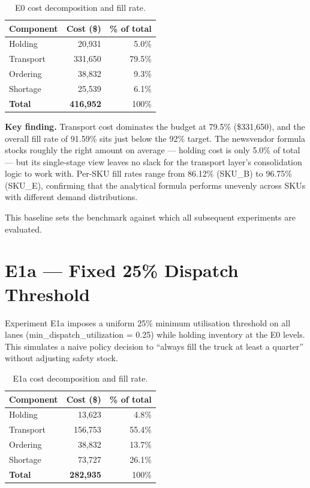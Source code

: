 \begin{table}[htbp]
  \centering
  \caption{E0 cost decomposition and fill rate.}
  \label{tab:e0}
  \begin{tabular}{@{}lrr@{}}
    \toprule
    Component & Cost (\$) & \% of total \\
    \midrule
    Holding    &  20,931 &  5.0\% \\
    Transport  & 331,650 & 79.5\% \\
    Ordering   &  38,832 &  9.3\% \\
    Shortage   &  25,539 &  6.1\% \\
    \midrule
    \textbf{Total} & \textbf{416,952} & 100\% \\
    \bottomrule
  \end{tabular}
\end{table}

\textbf{Key finding.}  Transport cost dominates the budget at 79.5\%
(\$331,650), and the overall fill rate of 91.59\% sits just below the 92\%
target.  The newsvendor formula stocks roughly the right amount on
average — holding cost is only 5.0\% of total — but its single-stage
view leaves no slack for the transport layer's consolidation logic to
work with.  Per-SKU fill rates range from 86.12\% (SKU\_B) to 96.75\%
(SKU\_E), confirming that the analytical formula performs unevenly
across SKUs with different demand distributions.

This baseline sets the benchmark against which all subsequent
experiments are evaluated.

\section{E1a --- Fixed 25\% Dispatch Threshold}
\label{sec:results:e1a}

Experiment E1a imposes a uniform 25\% minimum utilisation threshold
on all lanes (min\_dispatch\_utilization = 0.25) while holding
inventory at the E0 levels.  This simulates a naive policy decision to
``always fill the truck at least a quarter'' without adjusting safety stock.

\begin{table}[htbp]
  \centering
  \caption{E1a cost decomposition and fill rate.}
  \label{tab:e1a}
  \begin{tabular}{@{}lrr@{}}
    \toprule
    Component & Cost (\$) & \% of total \\
    \midrule
    Holding    &  13,623 &  4.8\% \\
    Transport  & 156,753 & 55.4\% \\
    Ordering   &  38,832 & 13.7\% \\
    Shortage   &  73,727 & 26.1\% \\
    \midrule
    \textbf{Total} & \textbf{282,935} & 100\% \\
    \bottomrule
  \end{tabular}
\end{table}


